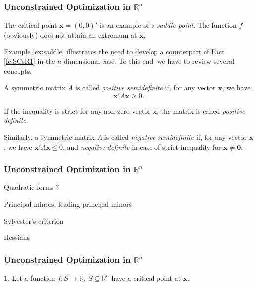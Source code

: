 \documentclass[10pt]{beamer}
\theoremstyle{definition}
\newtheorem{Fact}{\translate{Fact}}
\begin{document}
\begin{frame}[fragile]
\frametitle{Unconstrained Optimization in $ \mathbb{R}^n $}
\addtocounter{theorem}{-1}
\begin{example}[cont.]
The critical point $ \mathbf{x} = (0,0)' $ is an example of a \emph{saddle point}. The function $ f $ (obviously) does not attain an extremum at $ \mathbf{x} $.
\end{example}\bigskip

Example \ref{ex:saddle} illustrates the need to develop a counterpart of Fact \ref{fc:SCsR1} in the $ n $-dimensional case. To this end, we have to review several concepts. \bigskip

A symmetric matrix $ A $ is called \emph{positive semidefinite} if, for any vector $ \mathbf{x} $, we have \[ \mathbf{x'} A \mathbf{x} \geq 0. \]

If the inequality is strict for any non-zero vector $ \mathbf{x} $, the matrix is called \emph{positive definite}.

Similarly, a symmetric matrix $ A $ is called \emph{negative semidefinite} if, for any vector $ \mathbf{x} $, we have  $ \mathbf{x'} A \mathbf{x} \leq 0 $, and \emph{negative definite} in case of strict inequality for $ \mathbf{x} \neq \mathbf{0}$.
\end{frame}

\begin{frame}[fragile]
\frametitle{Unconstrained Optimization in $ \mathbb{R}^n $}
Quadratic forms ?

Principal minors, leading principal minors

Sylvester's criterion

Hessians
\end{frame}


\begin{frame}[fragile]
\frametitle{Unconstrained Optimization in $ \mathbb{R}^n $}
\begin{Fact}
Let a function $ f: S \rightarrow \mathbb{R},~ S \subseteq \mathbb{R}^n$ have a critical point at $ \mathbf{x} $.
\label{fc:ScsRn}
\end{Fact}
\end{frame}
\end{document}
